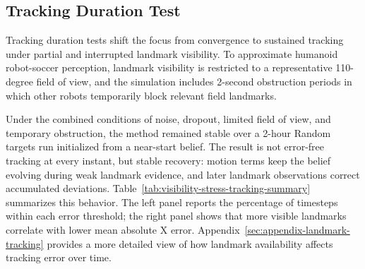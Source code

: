 \subsection{Tracking Duration Test}
\label{subsec:experiments-visibility-stress}

Tracking duration tests shift the focus from convergence to sustained tracking under partial and interrupted landmark visibility. To approximate humanoid robot-soccer perception, landmark visibility is restricted to a representative 110-degree field of view, and the simulation includes 2-second obstruction periods in which other robots temporarily block relevant field landmarks.

Under the combined conditions of noise, dropout, limited field of view, and temporary obstruction, the method remained stable over a 2-hour Random targets run initialized from a near-start belief. The result is not error-free tracking at every instant, but stable recovery: motion terms keep the belief evolving during weak landmark evidence, and later landmark observations correct accumulated deviations. Table~\ref{tab:visibility-stress-tracking-summary} summarizes this behavior. The left panel reports the percentage of timesteps within each error threshold; the right panel shows that more visible landmarks correlate with lower mean absolute X error. Appendix~\ref{sec:appendix-landmark-tracking} provides a more detailed view of how landmark availability affects tracking error over time.

